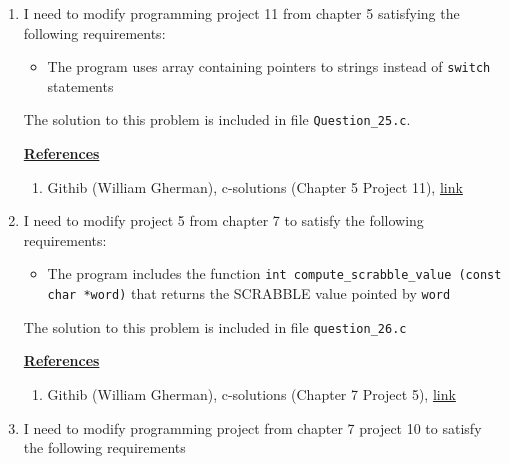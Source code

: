 \documentclass[12pt]{article}
\begin{document}
\begin{enumerate}[1.]
    \item

    I need to modify programming project 11 from chapter 5 satisfying the following requirements:

    \begin{itemize}
        \item The program uses array containing pointers to strings instead of \texttt{switch} statements
    \end{itemize}

    \bigskip

    The solution to this problem is included in file \texttt{Question\_25.c}.

    \bigskip

    \underline{\textbf{References}}

    \begin{enumerate}[1)]
        \item Githib (William Gherman), c-solutions (Chapter 5 Project 11), \href{https://github.com/williamgherman/c-solutions/blob/master/05/projects/11/11.c}{link}
    \end{enumerate}

    \item

    I need to modify project 5 from chapter 7 to satisfy the following requirements:

    \begin{itemize}
        \item The program includes the function \texttt{int compute\_scrabble\_value (const char *word)} that returns
        the SCRABBLE value pointed by \texttt{word}
    \end{itemize}

    \bigskip

    The solution to this problem is included in file \texttt{question\_26.c}

    \bigskip

    \underline{\textbf{References}}

    \begin{enumerate}[1)]
        \item Githib (William Gherman), c-solutions (Chapter 7 Project 5), \href{https://github.com/williamgherman/c-solutions/blob/master/07/projects/05/5.c}{link}
    \end{enumerate}

    \item

    I need to modify programming project from chapter 7 project 10 to satisfy the
    following requirements


\end{enumerate}
\end{document}

